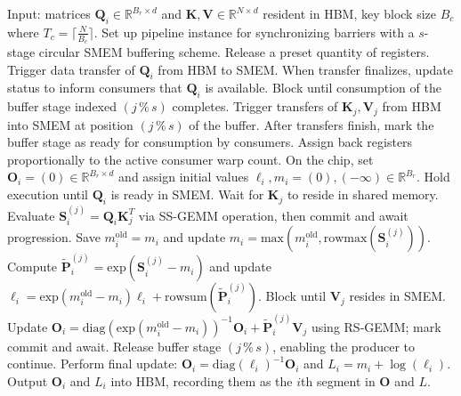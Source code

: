 \begin{algorithm}[H]
    \caption{\small\label{alg:flash3_wgmma_ws_only}\textsc{FlashAttention-3} forward computation \textbf{excluding} intra-consumer overlap -- CTA representation}
    \begin{algorithmic}[1]
\REQUIRE Input: matrices $\mathbf{Q}_i \in \mathbb{R}^{B_r \times d}$ and $\mathbf{K}, \mathbf{V} \in \mathbb{R}^{N \times d}$ resident in HBM, key block size $B_c$ where $T_c = \lceil \frac{N}{B_c} \rceil$.
\STATE Set up pipeline instance for synchronizing barriers with a $s$-stage circular SMEM buffering scheme.
\STATE Release a preset quantity of registers.
\STATE Trigger data transfer of $\mathbf{Q}_i$ from HBM to SMEM.
\STATE When transfer finalizes, update status to inform consumers that $\mathbf{Q}_i$ is available.
    \STATE Block until consumption of the buffer stage indexed $(j\,\%\,s)$ completes.
    \STATE Trigger transfers of $\mathbf{K}_j, \mathbf{V}_j$ from HBM into SMEM at position $(j\,\%\,s)$ of the buffer.
    \STATE After transfers finish, mark the buffer stage as ready for consumption by consumers.
\ENDFOR
\ELSE \STATE Assign back registers proportionally to the active consumer warp count.
\STATE On the chip, set $\mathbf{O}_i = (0) \in \mathbb{R}^{B_r \times d}$ and assign initial values $\ell_i, m_i = (0), (-\infty) \in \mathbb{R}^{B_r}$.
\STATE Hold execution until $\mathbf{Q}_i$ is ready in SMEM.
\STATE Wait for $\mathbf{K}_j$ to reside in shared memory.
\STATE Evaluate $\mathbf{S}_i^{(j)} = \mathbf{Q}_i \mathbf{K}_j^T$ via SS-GEMM operation, then commit and await progression. \label{alg:ws_only_gemm1}
\STATE Save $m_i^{\mathrm{old}} = m_i$ and update $m_i = \mathrm{max}(m_i^{\mathrm{old}}, \mathrm{rowmax}(\mathbf{S}_i^{(j)}))$. \label{code-ws:softmax_start}
\STATE Compute $\widetilde{\mathbf{P}}_i^{(j)} = \mathrm{exp}(\mathbf{S}_i^{(j)} - m_i)$ and update $\ell_i = \mathrm{exp}(m_i^{\mathrm{old}} - m_i) \ell_i + \mathrm{rowsum}(\widetilde{\mathbf{P}}_i^{(j)})$. \label{code-ws:softmax_end}
\STATE Block until $\mathbf{V}_j$ resides in SMEM.
\STATE Update $\mathbf{O}_i = \mathrm{diag}(\mathrm{exp}(m_i^{\mathrm{old}} - m_i))^{-1} \mathbf{O}_i + \widetilde{\mathbf{P}}_i^{(j)} \mathbf{V}_j$ using RS-GEMM; mark commit and await. \label{alg:ws_only_gemm2}
\STATE Release buffer stage $(j\,\%\,s)$, enabling the producer to continue.
\ENDFOR
\STATE Perform final update: $\mathbf{O}_i = \mathrm{diag}(\ell_i)^{-1} \mathbf{O}_i$ and $L_i = m_i + \log(\ell_i)$.
\STATE Output $\mathbf{O}_i$ and $L_i$ into HBM, recording them as the $i$th segment in $\mathbf{O}$ and $L$.
\ENDIF
\end{algorithmic}
\end{algorithm}

